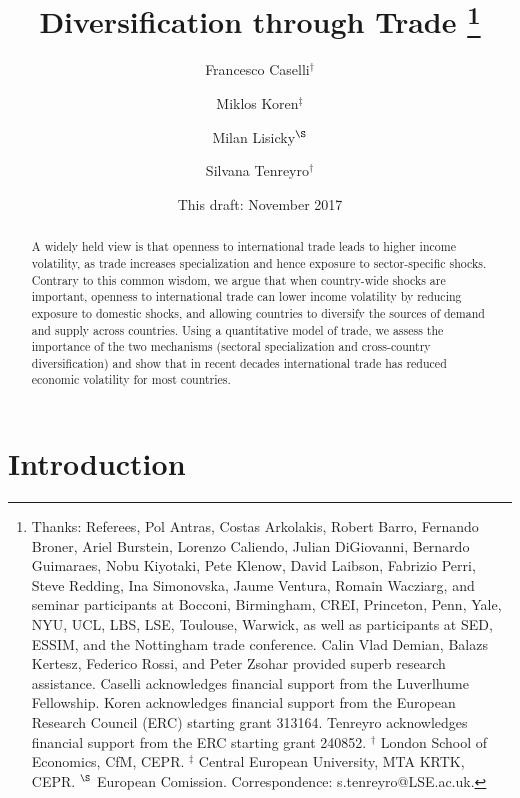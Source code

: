 \documentclass[12pt]{article}
\begin{document}
\title{Diversification through Trade \thanks{%
Thanks: Referees, Pol Antras, Costas Arkolakis, Robert Barro, Fernando
Broner, Ariel Burstein, Lorenzo Caliendo, Julian DiGiovanni, Bernardo
Guimaraes, Nobu Kiyotaki, Pete Klenow, David Laibson, Fabrizio Perri, Steve
Redding, Ina Simonovska, Jaume Ventura, Romain Wacziarg, and seminar
participants at Bocconi, Birmingham, CREI, Princeton, Penn, Yale, NYU, UCL,
LBS, LSE, Toulouse, Warwick, as well as participants at SED, ESSIM, and the
Nottingham trade conference. Calin Vlad Demian, Balazs Kertesz, Federico
Rossi, and Peter Zsohar provided superb research assistance. Caselli
acknowledges financial support from the Luverlhume Fellowship. Koren
acknowledges financial support from the European Research Council (ERC)
starting grant 313164. Tenreyro acknowledges financial support from the ERC
starting grant 240852. \newline
$^{\dag }$ London School of Economics, CfM, CEPR. $^{\ddag }$ Central
European University, MTA KRTK, CEPR. $^{\S }$ European Comission.
Correspondence: s.tenreyro@LSE.ac.uk.} }
\author{Francesco Caselli$^{\dag }$ \and Miklos Koren$^{\ddag }$ \and Milan
Lisicky$^{\S }$ \and Silvana Tenreyro$^{\dag }$}
\date{This draft: November 2017}
\maketitle

\begin{abstract}
A widely held view is that openness to international trade leads to higher
income volatility, as trade increases specialization and hence exposure to
sector-specific shocks. Contrary to this common wisdom, we argue that when
country-wide shocks are important, openness to international trade can lower
income volatility by reducing exposure to domestic shocks, and allowing
countries to diversify the sources of demand and supply across countries.
Using a quantitative model of trade, we assess the importance of the two
mechanisms (sectoral specialization and cross-country diversification) and
show that in recent decades international trade has reduced economic
volatility for most countries.
\end{abstract}

\section{Introduction}
\end{document}
